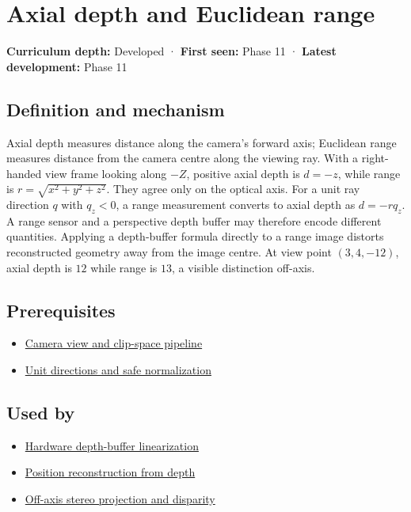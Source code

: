 \hypertarget{appendix-cac01ebeeb11}{}\label{referencestart:appendix-cac01ebeeb11}
\section{Axial depth and Euclidean range}\label{appendix-cac01ebeeb11-axial-depth-and-euclidean-range}

\textbf{Curriculum depth:} Developed · \textbf{First seen:} Phase 11 · \textbf{Latest development:} Phase 11

\subsection{Definition and mechanism}\label{appendix-cac01ebeeb11-definition-and-mechanism}

Axial depth measures distance along the camera's forward axis; Euclidean range measures distance from the camera centre along the viewing ray. With a right-handed view frame looking along \(-Z\), positive axial depth is \(d=-z\), while range is \(r=\sqrt{x^2+y^2+z^2}\). They agree only on the optical axis. For a unit ray direction \(q\) with \(q_z<0\), a range measurement converts to axial depth as \(d=-rq_z\). A range sensor and a perspective depth buffer may therefore encode different quantities. Applying a depth-buffer formula directly to a range image distorts reconstructed geometry away from the image centre. At view point \((3,4,-12)\), axial depth is \(12\) while range is \(13\), a visible distinction off-axis.

\subsection{Prerequisites}\label{appendix-cac01ebeeb11-prerequisites}

\begin{itemize}
\tightlist
\item
  \hyperref[appendix-1c07d64f5e70]{Camera view and clip-space pipeline}
\item
  \hyperref[appendix-f744e41b95b4]{Unit directions and safe normalization}
\end{itemize}

\subsection{Used by}\label{appendix-cac01ebeeb11-used-by}

\begin{itemize}
\tightlist
\item
  \hyperref[appendix-1bc40b08db4a]{Hardware depth-buffer linearization}
\item
  \hyperref[appendix-2cbf2968e866]{Position reconstruction from depth}
\item
  \hyperref[appendix-0976e86e5b9f]{Off-axis stereo projection and disparity}
\end{itemize}

